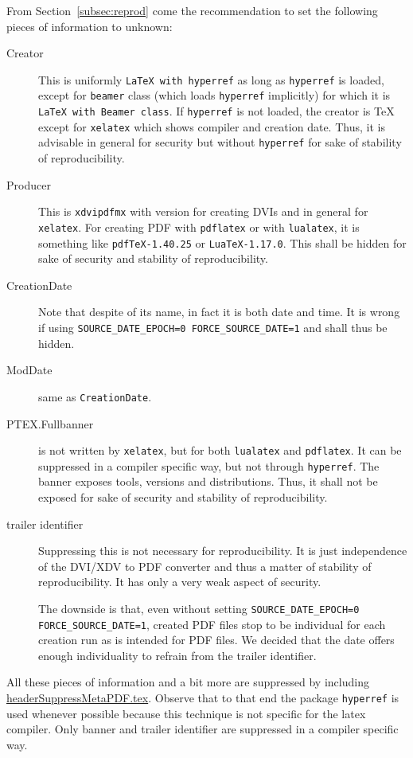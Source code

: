 \documentclass[a4paper]{article}%
\newcommand{\pdflatex}{\texttt{pdflatex}}
\newcommand{\lualatex}{\texttt{lualatex}}
\newcommand{\xelatex}{\texttt{xelatex}}
\begin{document}
From Section~\ref{subsec:reprod} come the recommendation 
to set the following pieces of information to unknown: 
%
\begin{description}
  \item[Creator] This is uniformly \texttt{LaTeX with hyperref} 
  as long as \texttt{hyperref} is loaded, except for \texttt{beamer} class 
  (which loads \texttt{hyperref} implicitly)
  for which it is \texttt{LaTeX with Beamer class}. 
  If \texttt{hyperref} is not loaded, 
  the creator is \TeX{} except for \xelatex{} which shows compiler and creation date. 
  Thus, it is advisable in general for security but without \texttt{hyperref} 
  for sake of stability of reproducibility. 
  \item[Producer] This is \texttt{xdvipdfmx} with version for creating DVIs 
  and in general for \xelatex. 
  For creating PDF with \pdflatex{} or with \lualatex, 
  it is something like \texttt{pdfTeX-1.40.25} or \texttt{LuaTeX-1.17.0}. 
  This shall be hidden for sake of security and stability of reproducibility. 
  \item[CreationDate] Note that despite of its name, in fact it is both date and time. 
  It is wrong if using \texttt{SOURCE\_DATE\_EPOCH=0 FORCE\_SOURCE\_DATE=1} 
  and shall thus be hidden. 
  \item[ModDate] same as \texttt{CreationDate}. 
  \item[PTEX.Fullbanner] is not written by \xelatex, 
  but for both \lualatex{} and \pdflatex. 
  It can be suppressed in a compiler specific way, 
  but not through \texttt{hyperref}. 
  The banner exposes tools, versions and distributions. 
  Thus, it shall not be exposed for sake of security and stability of reproducibility. 
  \item[trailer identifier]
  Suppressing this is not necessary for reproducibility. 
  It is just independence of the DVI/XDV to PDF converter 
  and thus a matter of stability of reproducibility. 
  It has only a very weak aspect of security. 
  
  The downside is that, 
  even without setting \texttt{SOURCE\_DATE\_EPOCH=0 FORCE\_SOURCE\_DATE=1}, 
  created PDF files stop to be individual for each creation run 
  as is intended for PDF files. 
  We decided that the date offers enough individuality 
  to refrain from the trailer identifier. 
\end{description}

All these pieces of information 
and a bit more are suppressed 
by including \href{\urlSite fromTex/headerSuppressMetaPDF.tex}{headerSuppressMetaPDF.tex}. 
Observe that to that end the package \texttt{hyperref} is used 
whenever possible because this technique is not specific for the latex compiler. 
Only banner and trailer identifier are suppressed in a compiler specific way. 
\end{document}
